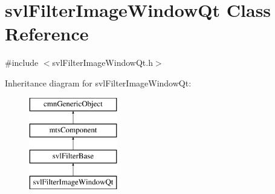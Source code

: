 \hypertarget{classsvl_filter_image_window_qt}{}\section{svl\+Filter\+Image\+Window\+Qt Class Reference}
\label{classsvl_filter_image_window_qt}


{\ttfamily \#include $<$svl\+Filter\+Image\+Window\+Qt.\+h$>$}

Inheritance diagram for svl\+Filter\+Image\+Window\+Qt\+:\begin{figure}[H]
\begin{center}
\leavevmode
\includegraphics[height=4.000000cm]{dc/dc2/classsvl_filter_image_window_qt}
\end{center}
\end{figure}
